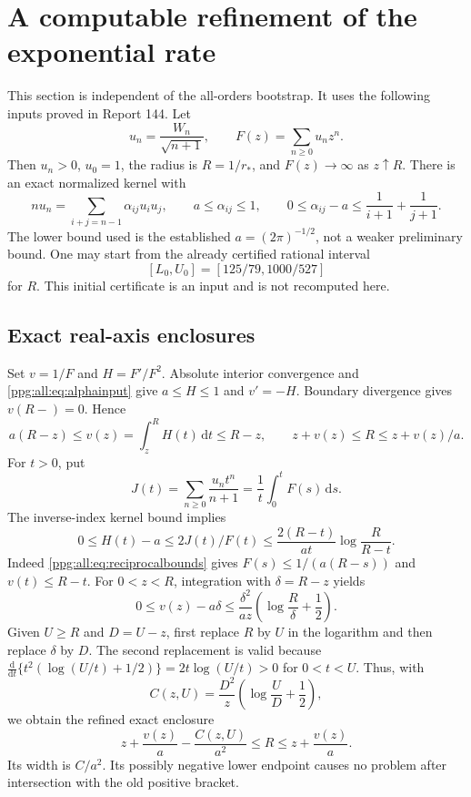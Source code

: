 \documentclass[11pt,letterpaper]{article}
\theoremstyle{remark}\newtheorem{remark}[theorem]{Remark}
\numberwithin{equation}{section}
\newcommand{\dd}{\mathrm d}
\begin{document}
\section{A computable refinement of the exponential rate}\label{ppg:all:sec:rate}
This section is independent of the all-orders bootstrap. It uses the following inputs proved in Report 144. Let
\[
 u_n=\frac{W_n}{\sqrt{n+1}},\qquad F(z)=\sum_{n\ge0}u_nz^n.
\]
Then $u_n>0$, $u_0=1$, the radius is $R=1/r_*$, and $F(z)\to\infty$ as $z\uparrow R$. There is an exact normalized kernel with
\begin{equation}\label{ppg:all:eq:alphainput}
 nu_n=\sum_{i+j=n-1}\alpha_{ij}u_iu_j,\qquad
 a\le\alpha_{ij}\le1,\qquad
 0\le\alpha_{ij}-a\le\frac1{i+1}+\frac1{j+1}.
\end{equation}
The lower bound used is the established $a=(2\pi)^{-1/2}$, not a weaker preliminary bound. One may start from the already certified rational interval
\begin{equation}\label{ppg:all:eq:initialR}
 [L_0,U_0]=[125/79,1000/527]
\end{equation}
for $R$. This initial certificate is an input and is not recomputed here.

\subsection{Exact real-axis enclosures}
Set $v=1/F$ and $H=F'/F^2$. Absolute interior convergence and \eqref{ppg:all:eq:alphainput} give $a\le H\le1$ and $v'=-H$. Boundary divergence gives $v(R-)=0$. Hence
\begin{equation}\label{ppg:all:eq:reciprocalbounds}
 a(R-z)\le v(z)=\int_z^R H(t)\,\dd t\le R-z,
 \qquad z+v(z)\le R\le z+v(z)/a.
\end{equation}
For $t>0$, put
\[
 J(t)=\sum_{n\ge0}\frac{u_nt^n}{n+1}=\frac1t\int_0^tF(s)\,\dd s.
\]
The inverse-index kernel bound implies
\[
 0\le H(t)-a\le2J(t)/F(t)
 \le\frac{2(R-t)}{at}\log\frac R{R-t}.
\]
Indeed \eqref{ppg:all:eq:reciprocalbounds} gives $F(s)\le1/(a(R-s))$ and $v(t)\le R-t$. For $0<z<R$, integration with $\delta=R-z$ yields
\begin{equation}\label{ppg:all:eq:defect}
 0\le v(z)-a\delta
 \le\frac{\delta^2}{az}\left(\log\frac R\delta+\frac12\right).
\end{equation}
Given $U\ge R$ and $D=U-z$, first replace $R$ by $U$ in the logarithm and then replace $\delta$ by $D$. The second replacement is valid because
$\frac{\dd}{\dd t}\{t^2(\log(U/t)+1/2)\}=2t\log(U/t)>0$ for $0<t<U$. Thus, with
\begin{equation}\label{ppg:all:eq:Crate}
 C(z,U)=\frac{D^2}z\left(\log\frac UD+\frac12\right),
\end{equation}
we obtain the refined exact enclosure
\begin{equation}\label{ppg:all:eq:refinedR}
 z+\frac{v(z)}a-\frac{C(z,U)}{a^2}\le R\le z+\frac{v(z)}a.
\end{equation}
Its width is $C/a^2$. Its possibly negative lower endpoint causes no problem after intersection with the old positive bracket.
\end{document}
